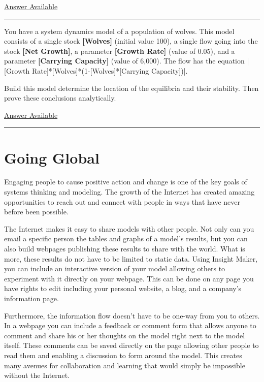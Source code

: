 \documentclass[]{memoir}
\newcommand{\DecValTok}[1]{\textcolor[rgb]{0.25,0.63,0.44}{{#1}}}
\newcommand{\NormalTok}[1]{{#1}}
\newcommand{\p}[1]{\textbf{{[}#1{]}}}
\begin{document}
\hyperref[Ans-11-20]{Answer Available}

\begin{center}\rule{3in}{0.4pt}\end{center}


You have a system dynamics model of a population of wolves. This model
consists of a single stock \p{Wolves} (initial value 100), a single flow
going into the stock \p{Net Growth}, a parameter \p{Growth Rate} (value
of 0.05), and a parameter \p{Carrying Capacity} (value of 6,000). The
flow has the equation
|\NormalTok{[Growth Rate]*[Wolves]*(}\DecValTok{1}\NormalTok{-[Wolves]*[Carrying Capacity])}|.

Build this model determine the location of the equilibria and their
stability. Then prove these conclusions analytically.

\hyperref[Ans-11-21]{Answer Available}

\begin{center}\rule{3in}{0.4pt}\end{center}

\chapter{Going Global}

Engaging people to cause positive action and change is one of the key
goals of systems thinking and modeling. The growth of the Internet has
created amazing opportunities to reach out and connect with people in
ways that have never before been possible.

The Internet makes it easy to share models with other people. Not only
can you email a specific person the tables and graphs of a model's
results, but you can also build webpages publishing these results to
share with the world. What is more, these results do not have to be
limited to static data. Using Insight Maker, you can include an
interactive version of your model allowing others to experiment with it
directly on your webpage. This can be done on any page you have rights
to edit including your personal website, a blog, and a company's
information page.

Furthermore, the information flow doesn't have to be one-way from you to
others. In a webpage you can include a feedback or comment form that
allows anyone to comment and share his or her thoughts on the model
right next to the model itself. These comments can be saved directly on
the page allowing other people to read them and enabling a discussion to
form around the model. This creates many avenues for collaboration and
learning that would simply be impossible without the Internet.
\end{document}
